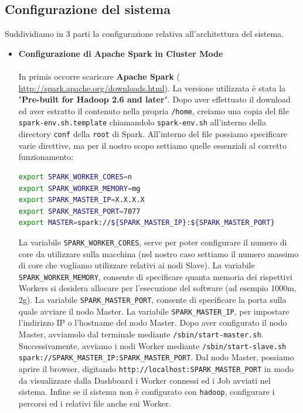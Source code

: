 \documentclass[12pt]{article}
\begin{document}
\subsection {Configurazione del sistema}
Suddividiamo in 3 parti la configurazione relativa all'architettura del sistema.
\begin{itemize}
\item {\textbf{Configurazione di Apache Spark in Cluster Mode}}\\\\
In primis occorre scaricare \textbf{Apache Spark} ( \href{http://spark.apache.org/downloads.html}{http://spark.apache.org/downloads.html}). La versione utilizzata è stata la "\textbf{Pre-built for Hadoop 2.6 and later}".
Dopo aver effettuato il download ed aver estratto il contenuto nella propria \texttt{/home}, creiamo una copia del file \texttt{spark-env.sh.template} chiamandolo \texttt{spark-env.sh} all'interno della directory \texttt{conf} della \texttt{root} di Spark. All'interno del file possiamo specificare varie direttive, ma per il nostro scopo settiamo quelle essenziali al corretto funzionamento:
\begin{lstlisting}[language=bash, caption=spark-env.sh]
export SPARK_WORKER_CORES=n
export SPARK_WORKER_MEMORY=mg
export SPARK_MASTER_IP=X.X.X.X
export SPARK_MASTER_PORT=7077
export MASTER=spark://${SPARK_MASTER_IP}:${SPARK_MASTER_PORT}
\end{lstlisting}
La variabile \texttt{SPARK\_WORKER\_CORES}, serve per poter configurare il numero di core da utilizzare sulla macchina (nel nostro caso settiamo il numero massimo di core che vogliamo utilizzare relativi ai nodi Slave).
La variabile \texttt{SPARK\_WORKER\_MEMORY}, consente di specificare quanta memoria dei rispettivi Workers si desidera allocare per l'esecuzione del software (ad esempio 1000m, 2g).
La variabile \texttt{SPARK\_MASTER\_PORT}, consente di specificare la porta sulla quale avviare il nodo Master.
La variabile \texttt{SPARK\_MASTER\_IP}, per impostare l'indirizzo IP o l'hostname del nodo Master. 
Dopo aver configurato il nodo Master, avviamolo dal terminale mediante \texttt{/sbin/start-master.sh}.
Successivamente, avviamo i nodi Worker mediante \texttt{/sbin/start-slave.sh spark://SPARK\_MASTER\_IP:SPARK\_MASTER\_PORT}.
Dal nodo Master, possiamo aprire il browser, digitando \texttt{http://localhost:SPARK\_MASTER\_PORT} in modo da visualizzare dalla Dashboard i Worker connessi ed i Job avviati nel sistema.
Infine se il sistema non è configurato con \texttt{hadoop}, configurare i percorsi ed i relativi file anche sui Worker.


\end{itemize}
\end{document}

